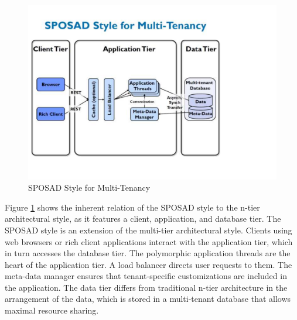 \begin{figure}[h]
\centering
\includegraphics{patterns/Multi-tenantApplicationDiagram-01.pdf}
\caption{SPOSAD Style for Multi-Tenancy}
\label{fig:Multi-tenantApplicationDiagram-01}
\end{figure}

Figure \ref{fig:Multi-tenantApplicationDiagram-01} shows the inherent relation of the SPOSAD style to the n-tier architectural style, as it features a client, application, and database tier. The SPOSAD style is an extension of the multi-tier architectural style. Clients using web browsers or rich client applications interact with the application tier, which in turn accesses the database tier. The polymorphic application threads are the heart of the application tier. A load balancer directs user requests to them. The meta-data manager ensures that tenant-specific customizations are included in the application. The data tier differs from traditional n-tier architecture in the arrangement of the data, which is stored in a multi-tenant database that allows maximal resource sharing.

